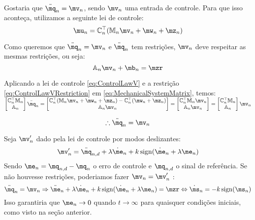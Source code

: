 Gostaria que $ \ddot{\mq}_n = \mv_n $, sendo $\mv_n$ uma entrada de controle. Para que isso aconte\c{c}a, utilizamos a seguinte lei de controle:
\begin{equation} \label{eq:ControlLawV}
\mu_n = \mC_n^\top ( \mM_n \mv_n + \mw_n + \mz_n )
\end{equation}

Como queremos que $ \ddot{\mq}_n = \mv_n $ e $\ddot{\mq}_n$ tem restri\c{c}\~oes, $\mv_n$ deve respeitar as mesmas restri\c{c}\~oes, ou seja:
\begin{equation} \label{eq:ControlLawVRestriction}
\mA_n \mv_n + \mb_n = \mzr
\end{equation}

Aplicando a lei de controle \eqref{eq:ControlLawV} e a restri\c{c}\~ao \eqref{eq:ControlLawVRestriction} em \eqref{eq:MechanicalSystemMatrix}, temos: \\

$ \begin{bmatrix}
\mC_n^\top \mM_n \\
\mA_n
\end{bmatrix}
\ddot{\mq}_n
=
\begin{bmatrix}
\mC_n^\top ( \mM_n \mv_n + \mw_n + \mz_n ) - \mC_n^\top(\mw_n + \mz_n) \\
\mA_n \mv_n
\end{bmatrix}
=
\begin{bmatrix}
\mC_n^\top  \mM_n \mv_n \\
\mA_n \mv_n
\end{bmatrix}
=
\begin{bmatrix}
\mC_n^\top \mM_n \\
\mA_n
\end{bmatrix}
\mv_n $

\begin{equation} \label{eq:ClosedLoopV}
\therefore \ddot{\mq}_n = \mv_n
\end{equation}

Seja $\mv'_n$ dado pela lei de controle por modos deslizantes:
\begin{equation} \label{eq:SMControlowLasV1'}
\mv'_n = \ddot{\mq}_{n, d} + \lambda \dot{\me}_n + k \sign (\dot{\me}_n + \lambda \me_n)
\end{equation}
Sendo $ \me_n = \mq_{n,d} - \mq_n $ o erro de controle e $\mq_{n,d}$ o sinal de refer\^encia. Se n\~ao houvesse restri\c{c}\~oes, poderiamos fazer $ \mv_n = \mv'_n $ :
$$ \ddot{\mq}_n = \mv_n \Rightarrow  \ddot{\me}_n + \lambda \dot{\me}_n + k \sign (\dot{\me}_n + \lambda \me_n) = \mzr \Leftrightarrow \dot{\ms}_n = - k \sign(\ms_n)$$
Isso garantiria que $\me_n \rightarrow 0$ quando $t \rightarrow \infty$ para quaisquer condi\c{c}\~oes iniciais, como visto na se\c{c}\~ao anterior. \\


